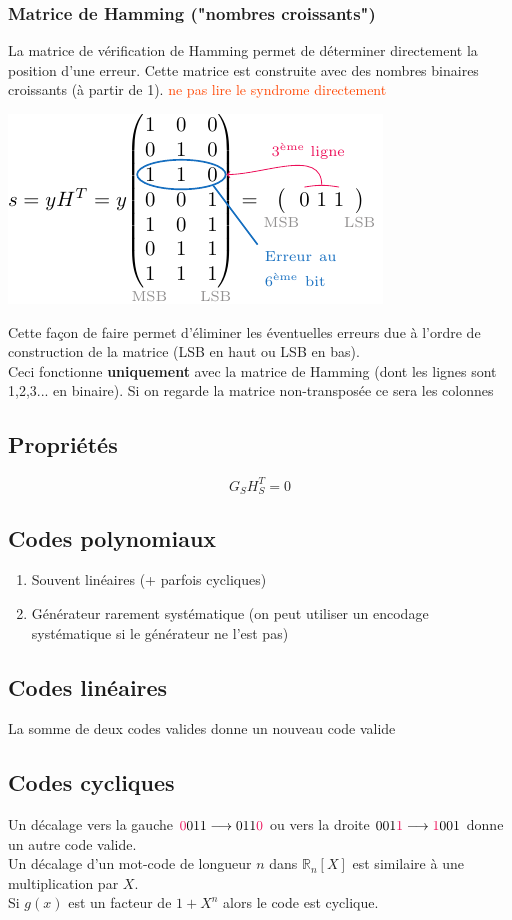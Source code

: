 \documentclass[resume.tex]{subfiles}
\begin{document}
\subsubsection{Matrice de Hamming ("nombres croissants")}
La matrice de vérification de Hamming permet de déterminer directement la position d'une erreur. Cette matrice est construite avec des nombres binaires croissants (à partir de 1). \textcolor{OrangeRed}{ne pas lire le syndrome directement}
\begin{center}
\includegraphics[scale=1]{drwg_6.pdf}
\end{center}
Cette façon de faire permet d'éliminer les éventuelles erreurs due à l'ordre de construction de la matrice (LSB en haut ou LSB en bas).\\
Ceci fonctionne \textbf{uniquement} avec la matrice de Hamming (dont les lignes sont 1,2,3... en binaire). Si on regarde la matrice non-transposée ce sera les colonnes



\subsection{Propriétés}
$$G_SH_S^T=0$$
\subsection{Codes polynomiaux}
\begin{enumerate}
\item Souvent linéaires (+ parfois cycliques)
\item Générateur rarement systématique (on peut utiliser un encodage systématique si le générateur ne l'est pas)
\end{enumerate}
\subsection{Codes linéaires}
La somme de deux codes valides donne un nouveau code valide
\subsection{Codes cycliques}
Un décalage vers la gauche $\textcolor{OrangeRed}{0}011\longrightarrow 011\textcolor{OrangeRed}{0}$ ou vers la droite $001\textcolor{OrangeRed}{1}\longrightarrow \textcolor{OrangeRed}{1}001$ donne un autre code valide.\\
Un décalage d'un mot-code de longueur $n$ dans $\mathbb{R}_n[X]$ est similaire à une multiplication par $X$.\\
Si $g(x)$ est un facteur de $1+X^n$ alors le code est cyclique.
\end{document}
